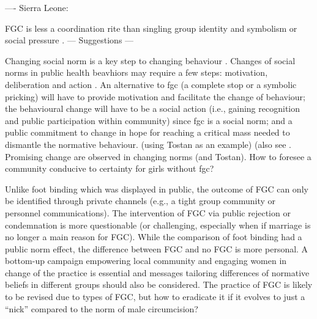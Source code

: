 \documentclass[12pt,]{article}
\begin{document}
---- Sierra Leone: 
\cite{Sagn14}  


FGC is less a coordination rite than singling group identity and symbolism \cite{ShelWand11, Youn15} or social pressure \cite{}.
— Suggestions —

Changing social norm is a key step to changing behaviour  .  Changes of social norms in public health beavhiors may require a few steps:  motivation, deliberation and action \cite{CislHeis18a}.  An alternative to fgc (a complete stop or a symbolic pricking) will have to provide motivation and facilitate the change of behaviour; the behavioural change will have to be a social action (i.e., gaining recognition and public participation within community) since fgc is a social norm;  and a public commitment to change in hope for reaching a critical mass needed to dismantle the normative behaviour. (using Tostan as an example) (also see \cite{Youn15}.  Promising change are observed in changing norms \cite{EvanSnid19} (and Tostan).  How to foresee a community conducive to certainty for girls without fgc?

Unlike foot binding which was displayed in public, the outcome of FGC can only be identified through private channels (e.g., a tight group community or personnel communications).  The intervention of FGC via public rejection or condemnation is more questionable (or challenging, especially when if marriage is no longer a main reason for FGC).  While the comparison of foot binding had a public norm effect, the difference between FGC and no FGC is more personal.  A bottom-up campaign empowering local community and engaging women in change of the practice is essential \cite{BergDeni13b} and messages tailoring differences of normative beliefs in different groups should also be considered.  The practice of FGC is likely to be revised due to types of FGC, but how to eradicate it if it evolves to just a “nick” compared to the norm of male circumcision?
\end{document}
